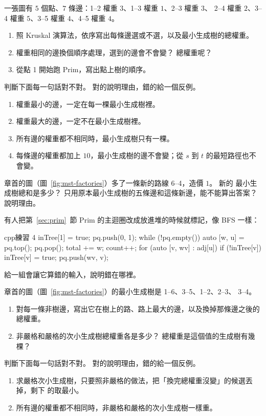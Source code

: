 \begin{drills}[label=drills:ch9]
\item 一張圖有 $5$ 個點、$7$ 條邊：1--2 權重 $3$、1--3 權重 $1$、2--3 權重 $3$、
2--4 權重 $2$、3--4 權重 $5$、3--5 權重 $4$、4--5 權重 $4$。
\begin{enumerate}
\item 照 Kruskal 演算法，依序寫出每條邊選或不選，以及最小生成樹的總權重。
\item 權重相同的邊換個順序處理，選到的邊會不會變？ 總權重呢？
\item 從點 1 開始跑 Prim，寫出點上樹的順序。
\end{enumerate}

\item 判斷下面每一句話對不對。 對的說明理由，錯的給一個反例。
\begin{enumerate}
\item 權重最小的邊，一定在每一棵最小生成樹裡。
\item 權重最大的邊，一定不在最小生成樹裡。
\item 所有邊的權重都不相同時，最小生成樹只有一棵。
\item 每條邊的權重都加上 $10$，最小生成樹的邊不會變；從 $s$ 到 $t$ 的最短路徑也不
會變。
\end{enumerate}

\item 章首的圖（圖~\ref{fig:mst-factories}）多了一條新的路線 6--4，造價 $1$。 新的
最小生成樹總和是多少？ 只用原本最小生成樹的五條邊和這條新邊，能不能算出答案？
說明理由。

\item 有人把第~\ref{sec:prim}~節 Prim 的主迴圈改成放進堆的時候就標記，像 BFS 一樣：
\begin{code}{cpp}{練習 4}
inTree[1] = true;
pq.push({0, 1});
while (!pq.empty()) {
    auto [w, u] = pq.top();
    pq.pop();
    total += w;
    count++;
    for (auto [v, wv] : adj[u]) {
        if (!inTree[v]) {
            inTree[v] = true;
            pq.push({wv, v});
        }
    }
}
\end{code}
給一組會讓它算錯的輸入，說明錯在哪裡。

\item 章首的圖（圖~\ref{fig:mst-factories}）的最小生成樹是 1--6、3--5、1--2、2--3、
3--4。
\begin{enumerate}
\item 對每一條非樹邊，寫出它在樹上的路、路上最大的邊，以及換掉那條邊之後的總權重。
\item 非嚴格和嚴格的次小生成樹總權重各是多少？ 總權重是這個值的生成樹有幾棵？
\end{enumerate}

\item 判斷下面每一句話對不對。 對的說明理由，錯的給一個反例。
\begin{enumerate}
\item 求嚴格次小生成樹，只要照非嚴格的做法，把「換完總權重沒變」的候選丟掉，剩下
的取最小。
\item 所有邊的權重都不相同時，非嚴格和嚴格的次小生成樹一樣重。
\end{enumerate}
\end{drills}

